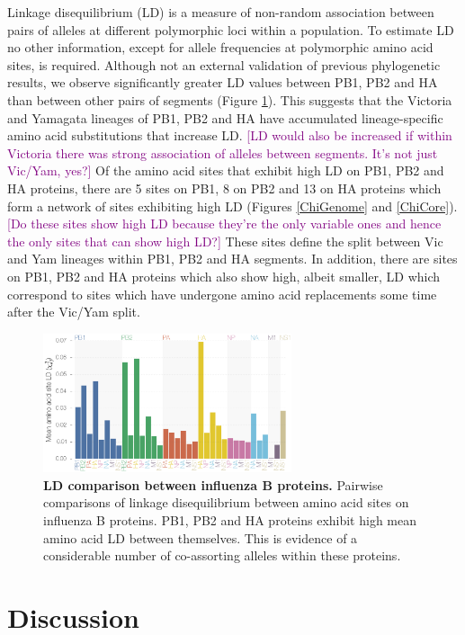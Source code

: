 \documentclass[11pt,oneside,letterpaper]{article}
\def\tbc#1{\textcolor{purple}{[#1]}}
\begin{document}
Linkage disequilibrium (LD) is a measure of non-random association between pairs of alleles at different polymorphic loci within a population.
To estimate LD no other information, except for allele frequencies at polymorphic amino acid sites, is required.
Although not an external validation of previous phylogenetic results, we observe significantly greater LD values between PB1, PB2 and HA than between other pairs of segments (Figure \ref{segmentLD}).
This suggests that the Victoria and Yamagata lineages of PB1, PB2 and HA have accumulated lineage-specific amino acid substitutions that increase LD.
\tbc{LD would also be increased if within Victoria there was strong association of alleles between segments.  It's not just Vic/Yam, yes?}
Of the amino acid sites that exhibit high LD on PB1, PB2 and HA proteins, there are 5 sites on PB1, 8 on PB2 and 13 on HA proteins which form a network of sites exhibiting high LD (Figures \ref{ChiGenome} and \ref{ChiCore}).
\tbc{Do these sites show high LD because they're the only variable ones and hence the only sites that can show high LD?}
These sites define the split between Vic and Yam lineages within PB1, PB2 and HA segments.
In addition, there are sites on PB1, PB2 and HA proteins which also show high, albeit smaller, LD which correspond to sites which have undergone amino acid replacements some time after the Vic/Yam split.

\begin{figure}[h]
	\centering	
	\includegraphics[width=0.65\textwidth]{figures/InfB_aaMeanLD.png}
	\caption{\textbf{LD comparison between influenza B proteins.}
Pairwise comparisons of linkage disequilibrium between amino acid sites on influenza B proteins.
PB1, PB2 and HA proteins exhibit high mean amino acid LD between themselves.
This is evidence of a considerable number of co-assorting alleles within these proteins.}
	\label{segmentLD}
\end{figure}

\section*{Discussion}
\end{document}
